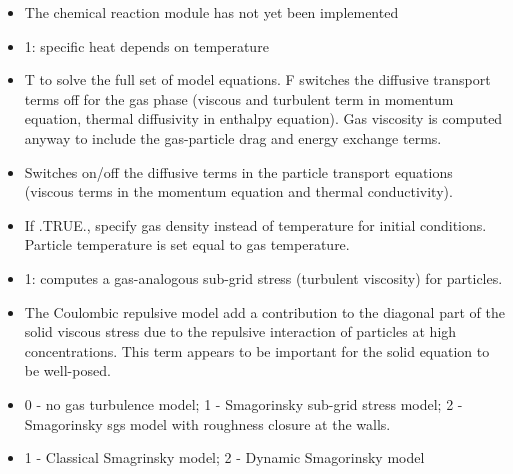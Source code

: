 \begin{itemize}

\item
{}
{The chemical reaction module has not yet been implemented}

\item
{}
{1: specific heat depends on temperature}

\item
{}
{T to solve the full set of model equations. F switches the diffusive
transport terms off for the gas phase (viscous and turbulent term in momentum 
equation, thermal diffusivity in enthalpy equation). 
Gas viscosity is computed anyway to include the gas-particle drag and
energy exchange terms.}

\item
{}
{Switches on/off the diffusive terms in the particle transport equations 
(viscous terms in the momentum equation and thermal conductivity).}

\item
{}
{If .TRUE., specify gas density instead of temperature for initial conditions.
Particle temperature is set equal to gas temperature.}

\item
{}
{1: computes a gas-analogous sub-grid stress (turbulent viscosity)
for particles.}

\item
{}
{The Coulombic repulsive model add a contribution to the diagonal part of
the solid viscous stress due to the repulsive interaction of particles 
at high concentrations. This term appears to be important for the solid
equation to be well-posed.}

\item
{}
{0 - no gas turbulence model; 1 - Smagorinsky sub-grid stress model;
2 - Smagorinsky sgs model with roughness closure at the walls.}

\item
{}
{1 - Classical Smagrinsky model; 2 - Dynamic Smagorinsky model}


\end{itemize}

